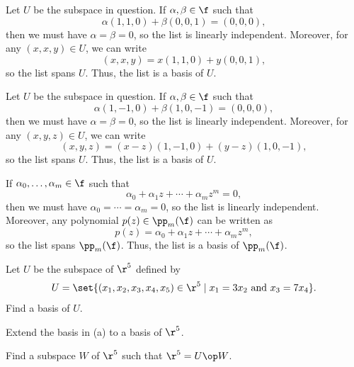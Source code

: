\begin{sole}
    \item Let $U$ be the subspace in question. If $\alpha, \beta \in \f$ such that
    \[\alpha(1, 1, 0) + \beta(0, 0, 1) = (0, 0, 0),\]
    then we must have $\alpha = \beta = 0$, so the list is linearly independent. Moreover, for any $(x, x, y) \in U$, we can write
    \[(x, x, y) = x(1, 1, 0) + y(0, 0, 1),\]
    so the list spans $U$. Thus, the list is a basis of $U$.
    \item Let $U$ be the subspace in question. If $\alpha, \beta \in \f$ such that
    \[\alpha(1, -1, 0) + \beta(1, 0, -1) = (0, 0, 0),\]
    then we must have $\alpha = \beta = 0$, so the list is linearly independent. Moreover, for any $(x, y, z) \in U$, we can write
    \[(x, y, z) = (x - z)(1, -1, 0) + (y - z)(1, 0, -1),\]
    so the list spans $U$. Thus, the list is a basis of $U$.
    \item If $\alpha_0, \ldots, \alpha_m \in \f$ such that
    \[\alpha_0 + \alpha_1 z + \cdots + \alpha_m z^m = 0,\]
    then we must have $\alpha_0 = \cdots = \alpha_m = 0$, so the list is linearly independent. Moreover, any polynomial $p(z) \in \pp_m(\f)$ can be written as
    \[p(z) = \alpha_0 + \alpha_1 z + \cdots + \alpha_m z^m,\]
    so the list spans $\pp_m(\f)$. Thus, the list is a basis of $\pp_m(\f)$.
\end{sole}

\begin{exercise}[2b3]
    \begin{subexercises}
        \item Let $U$ be the subspace of $\r^5$ defined by
        \[U = \set{(x_1, x_2, x_3, x_4, x_5) \in \r^5 \mid x_1 = 3x_2 \text{ and } x_3 = 7x_4}.\]
        Find a basis of $U$.
        \item Extend the basis in (a) to a basis of $\r^5$.
        \item Find a subspace $W$ of $\r^5$ such that $\r^5 = U \op W$.
    \end{subexercises}
\end{exercise}

